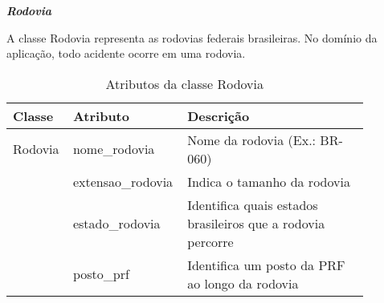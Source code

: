 \vfill
\pagebreak
    
\noindent
\emph{\textbf{Rodovia}}

  A classe Rodovia representa as rodovias federais brasileiras. No domínio da aplicação, todo acidente ocorre em uma rodovia.
  
    \begin{table*}[!h]
    \centering
    \begin{tabular}{p{0.15\linewidth}p{0.23\linewidth}p{0.5\linewidth}}
      \hline
      \textbf{Classe} & \textbf{Atributo} & \textbf{Descrição}\\
      \hline
	Rodovia & nome\_rodovia & Nome da rodovia (Ex.: BR-060)\\
		& extensao\_rodovia & Indica o tamanho da rodovia\\
		& estado\_rodovia & Identifica quais estados brasileiros que a rodovia percorre\\
		& posto\_prf & Identifica um posto da PRF ao longo da rodovia\\
      \hline
    \end{tabular}
    \caption{Atributos da classe Rodovia}
    \label{tab:attr_rodovia}
    \end{table*}
    
\vfill    